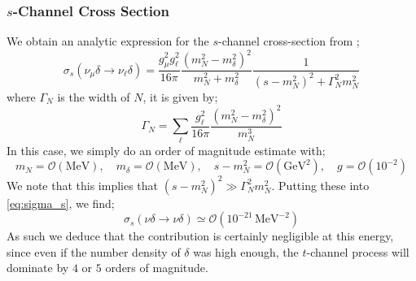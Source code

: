 \documentclass[11pt]{article}
\numberwithin{equation}{section}
\numberwithin{figure}{section}
\numberwithin{table}{section}
\newcommand{\mO}{\mathcal{O}}
\begin{document}
\subsubsection{$s$-Channel Cross Section}\label{sec:schannel}
We obtain an analytic expression for the $s$-channel cross-section from \cite{Franarin2018};
\begin{equation}
  \sigma_s(\nu_\mu\delta \rightarrow \nu_\ell \delta) = \frac{g_\mu^2 g_\ell^2}{16\pi}\frac{(m_N^2 - m_\delta^2)^2}{m_N^2 + m_\delta^2} \frac{1}{(s - m_N^2)^2 + \Gamma_N^2 m_N^2}
\end{equation}
where $\Gamma_N$ is the width of $N$, it is given by;
\begin{equation}\label{eq:sigma_s}
  \Gamma_N = \sum_{\ell}{\frac{g_\ell^2}{16\pi} \frac{(m_N^2 - m_\delta^2)^2}{m_N^3}}
\end{equation}
In this case, we simply do an order of magnitude estimate with;
\begin{equation}
  m_N = \mO(\textrm{MeV}), \quad m_\delta = \mO(\textrm{MeV}), \quad s - m_N^2 = \mO(\textrm{GeV}^2), \quad g = \mO(10^{-2})
\end{equation}
We note that this implies that $(s - m_N^2)^2 \gg \Gamma_N^2 m_N^2$. Putting these into \eqref{eq:sigma_s}, we find;
\begin{equation}
  \sigma_s(\nu\delta \rightarrow \nu\delta) \simeq \mO(10^{-21}\,\textrm{MeV}^{-2})
\end{equation}
As such we deduce that the contribution is certainly negligible at this energy, since even if the number density of $\delta$ was high enough, the $t$-channel process will dominate by $4$ or $5$ orders of magnitude. 
\end{document}
